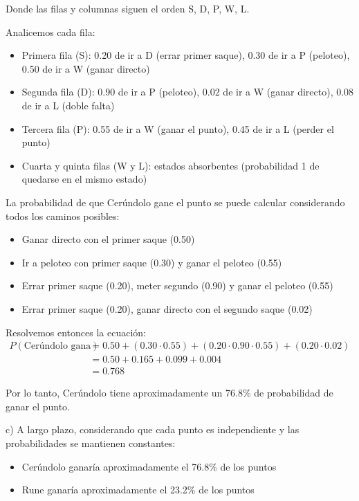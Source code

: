 \documentclass[a4paper,11pt]{article}
\begin{document}
\begin{center}
Donde las filas y columnas siguen el orden S, D, P, W, L.
\end{center}

\vspace{0.5em}
Analicemos cada fila:
\begin{itemize}
    \item Primera fila (S): 0.20 de ir a D (errar primer saque), 0.30 de ir a P (peloteo), 0.50 de ir a W (ganar directo)
    \item Segunda fila (D): 0.90 de ir a P (peloteo), 0.02 de ir a W (ganar directo), 0.08 de ir a L (doble falta)
    \item Tercera fila (P): 0.55 de ir a W (ganar el punto), 0.45 de ir a L (perder el punto)
    \item Cuarta y quinta filas (W y L): estados absorbentes (probabilidad 1 de quedarse en el mismo estado)
\end{itemize}

La probabilidad de que Cerúndolo gane el punto se puede calcular considerando todos los caminos posibles:
\begin{itemize}
    \item Ganar directo con el primer saque (0.50)
    \item Ir a peloteo con primer saque (0.30) y ganar el peloteo (0.55)
    \item Errar primer saque (0.20), meter segundo (0.90) y ganar el peloteo (0.55)
    \item Errar primer saque (0.20), ganar directo con el segundo saque (0.02)
\end{itemize}

Resolvemos entonces la ecuación:
\[
\begin{split}
P(\text{Cerúndolo gana}) &= 0.50 + (0.30 \cdot 0.55) + (0.20 \cdot 0.90 \cdot 0.55) + (0.20 \cdot 0.02) \\
&= 0.50 + 0.165 + 0.099 + 0.004 \\
&= 0.768
\end{split}
\]

Por lo tanto, Cerúndolo tiene aproximadamente un 76.8\% de probabilidad de ganar el punto.

\vspace{0.5em}

c) A largo plazo, considerando que cada punto es independiente y las probabilidades se mantienen constantes:
\begin{itemize}
    \item Cerúndolo ganaría aproximadamente el 76.8\% de los puntos
    \item Rune ganaría aproximadamente el 23.2\% de los puntos
\end{itemize}
\end{document}
